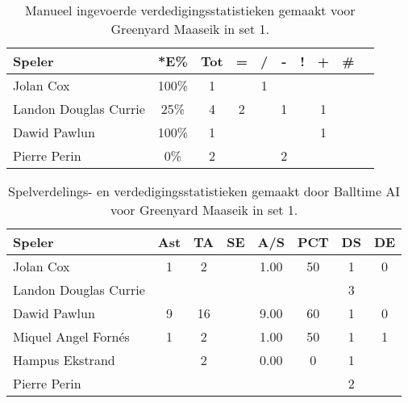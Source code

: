 \begin{table}[ht!]
    \centering
    \scriptsize
    \begin{tabular}{|l|c|c|c|c|c|c|c|c|c|} \hline
        \textbf{Speler} & *E\% & Tot & = & / & - & ! & + & \# \\ \hline
        Jolan Cox & 100\% & 1 &  & 1 &  &  &  & \\
        Landon Douglas Currie & 25\% & 4 & 2 &  & 1 &  & 1 & \\ 
        Dawid Pawlun & 100\% & 1 &  &  &  &  & 1 & \\
        Pierre Perin & 0\% & 2 &  &  & 2 &  &  &  \\ \hline
    \end{tabular}
    \caption[Manueel ingevoerde verdedigingsstatistieken gemaakt voor Greenyard Maaseik in set 1]{\label{tab:PL3DigMaaseikMan1}Manueel ingevoerde verdedigingsstatistieken gemaakt voor Greenyard Maaseik in set 1.}
\end{table}

\begin{table}[ht!]
  \centering
  \scriptsize
  \begin{tabular}{|l|c|c|c|c|c|c|c|} \hline
    \textbf{Speler} & Ast & TA & SE & A/S & PCT & DS & DE \\ \hline
    Jolan Cox & 1 & 2 &  & 1.00 & 50 & 1 & 0 \\
    Landon Douglas Currie &  &  &  &   &   & 3 &   \\
    Dawid Pawlun & 9 & 16 &  & 9.00 & 60 & 1 & 0 \\
    Miquel Angel Fornés & 1 & 2 &  & 1.00 & 50 & 1 & 1 \\
    Hampus Ekstrand &  & 2 &  & 0.00 & 0 & 1 & \\
    Pierre Perin &   &   &   &   &   & 2 &   \\ \hline
  \end{tabular}
  \caption[Spelverdelings- en verdedigingsstatistieken gemaakt door Balltime AI voor Greenyard Maaseik in set 1]{\label{tab:PL3SetDigMaaseikAI1}Spelverdelings- en verdedigingsstatistieken gemaakt door Balltime AI voor Greenyard Maaseik in set 1.}
\end{table}


